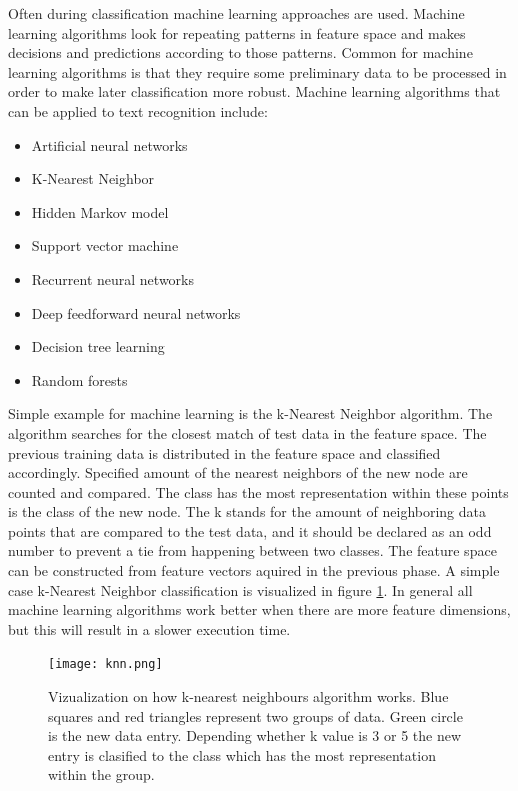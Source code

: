 \documentclass{article}
\begin{document}
        Often during classification machine learning approaches are used. Machine learning algorithms look for repeating patterns in feature space and makes decisions and predictions according to those patterns. Common for machine learning algorithms is that they require some preliminary data to be processed in order to make later classification more robust. Machine learning algorithms that can be applied to text recognition include:
        \begin{itemize}
          \item Artificial neural networks
          \item K-Nearest Neighbor
          \item Hidden Markov model
          \item Support vector machine
          \item Recurrent neural networks
          \item Deep feedforward neural networks
          \item Decision tree learning
          \item Random forests
        \end{itemize}
          Simple example for machine learning is the k-Nearest Neighbor algorithm. The algorithm searches for the closest match of test data in the feature space. The previous training data is distributed in the feature space and classified accordingly. Specified amount of the nearest neighbors of the new node are counted and compared. The class has the most representation within these points is the class of the new node. The k stands for the amount of neighboring data points that are compared to the test data, and it should be declared as an odd number to prevent a tie from happening between two classes. The feature space can be constructed from feature vectors aquired in the previous phase. A simple case k-Nearest Neighbor classification is visualized in figure \ref{fig:knn}. In general all machine learning algorithms work better when there are more feature dimensions, but this will result in a slower execution time.\cite{Beyer}
          \begin{figure}
            \centering
            \texttt{[image: knn.png]}
            \caption{Vizualization on how k-nearest neighbours algorithm works. Blue squares
                      and red triangles represent two groups of data. Green circle is the new
                      data entry. Depending whether k value is 3 or 5 the new entry is clasified
                      to the class which has the most representation within the group.\label{fig:knn}
                      }
          \end{figure}
\end{document}
